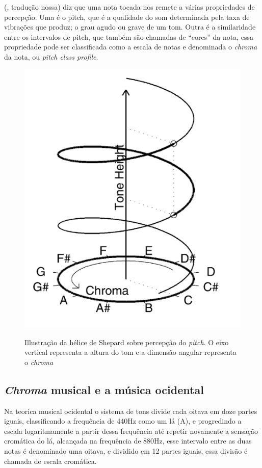  (\citeyear{shepard}, tradução nossa) diz que uma nota tocada nos remete a várias propriedades de percepção. Uma é o pitch, que é a qualidade do som determinada pela taxa de vibrações que produz; o grau agudo ou grave de um tom. Outra é a similaridade entre os intervalos de pitch, que também são chamadas de  ``cores'' da nota, essa propriedade pode ser classificada como a escala de notas e denominada o \emph{chroma} da nota, ou \emph{pitch class profile}.
\begin{figure}[h]
\caption{\small Illustração da hélice de Shepard sobre percepção do \emph{pitch}. O eixo vertical representa a altura do tom e a dimensão angular representa o \emph{chroma}}
\centering
\includegraphics[scale=0.8]{figs/chromaperception.png}
\label{f.chromaperception}
\end{figure}


\subsection{\emph{Chroma} musical e a música ocidental }
\label{ss.westmusic}

Na teorica musical ocidental o sistema de tons divide cada oitava em doze partes iguais, classificando a frequência de 440Hz como um lá (A), e progredindo a escala logaritmamente a partir dessa frequência até repetir novamente a sensação cromática do lá, alcançada na frequência de 880Hz, esse intervalo entre as duas notas é denominado uma oitava, e dividido em 12 partes iguais, essa divisão é chamada de escala cromática.

